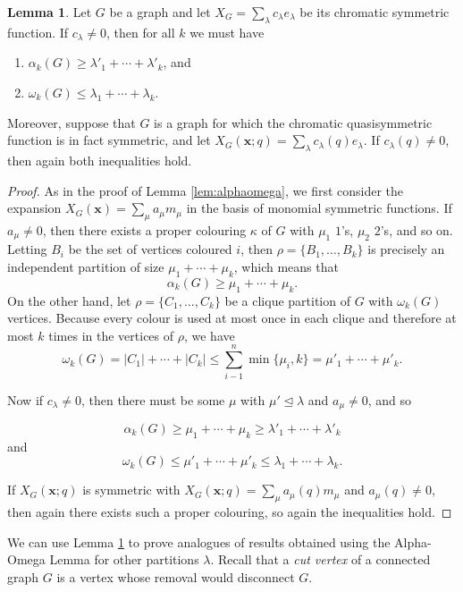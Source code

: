 \documentclass[12pt]{amsart}  %
\theoremstyle{definition}
\newtheorem{lemma}[theorem]{Lemma}
\theoremstyle{remark}
\numberwithin{equation}{section}
\newcommand{\la}{\lambda}
\begin{document}
\begin{lemma}\label{lem:kalphaomega}
Let $G$ be a graph and let $X_G=\sum_\lambda c_\lambda e_\lambda$ be its chromatic symmetric function. If $c_\lambda\neq 0$, then for all $k$ we must have
\begin{enumerate}
\item $\alpha_k(G)\geq\lambda'_1+\cdots+\lambda'_k$, and 
\item $\omega_k(G)\leq\lambda_1+\cdots+\lambda_k$.
\end{enumerate}

Moreover, suppose that $G$ is a graph for which the chromatic quasisymmetric function is in fact symmetric, and let $X_G(\bm x;q)=\sum_\lambda c_\lambda(q)e_\lambda$. If $c_\lambda(q)\neq 0$, then again both inequalities hold.
\end{lemma}

\begin{proof}
As in the proof of Lemma \ref{lem:alphaomega}, we first consider the expansion $X_G(\bm x)=\sum_\mu a_\mu m_\mu$ in the basis of monomial symmetric functions. If $a_\mu\neq 0$, then there exists a proper colouring $\kappa$ of $G$ with $\mu_1$ $1$'s, $\mu_2$ $2$'s, and so on. Letting $B_i$ be the set of vertices coloured $i$, then $\rho=\{B_1,\ldots,B_k\}$ is precisely an independent partition of size $\mu_1+\cdots+\mu_k$, which means that 
$$
\alpha_k(G)\geq\mu_1+\cdots+\mu_k.
$$
On the other hand, let $\rho=\{C_1,\ldots,C_k\}$ be a clique partition of $G$ with $\omega_k(G)$ vertices. Because every colour is used at most once in each clique and therefore at most $k$ times in the vertices of $\rho$, we have
$$
\omega_k(G)=|C_1|+\cdots+|C_k|\leq \sum_{i-1}^n \min\{\mu_i,k\}=\mu'_1+\cdots+\mu'_k.
$$

Now if $c_\lambda\neq 0$, then there must be some $\mu$ with $\mu'\unlhd\lambda$ and $a_\mu\neq 0$, and so

$$
\alpha_k(G)\geq\mu_1+\cdots+\mu_k\geq\lambda'_1+\cdots+\lambda'_k
$$
and 
$$
\omega_k(G)\leq\mu'_1+\cdots+\mu'_k\leq\lambda_1+\cdots+\lambda_k.
$$


If $X_G(\bm x;q)$ is symmetric with $X_G(\bm x;q)=\sum_\mu a_\mu(q)m_\mu$ and $a_\mu(q)\neq 0$, then again there exists such a proper colouring, so again the inequalities hold.
\end{proof}

We can use Lemma \ref{lem:kalphaomega} to prove analogues of results obtained using the Alpha-Omega Lemma for other partitions $\la$. Recall that a \emph{cut vertex} of a connected graph $G$ is a vertex whose removal would disconnect $G$.
\end{document}
